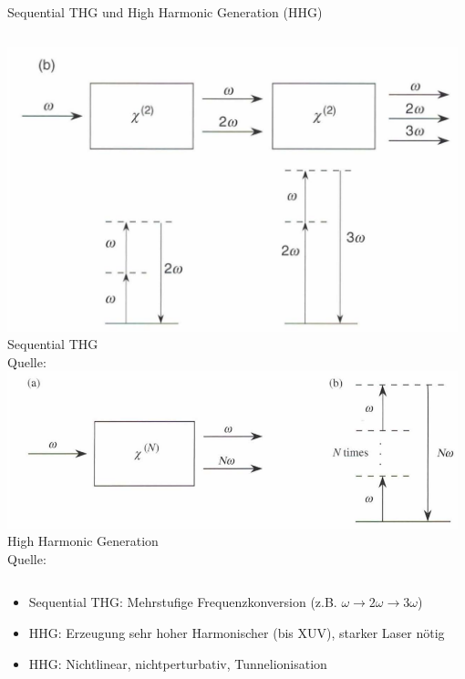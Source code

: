 \documentclass[aspectratio=169]{beamer} %
\newcommand{\figcite}[1]{\\[-3mm]{\tiny Quelle: \cite{#1}}}
\begin{document}

\begin{frame}[noframenumbering]{Sequential THG und High Harmonic Generation (HHG)}
  \begin{columns}[T,onlytextwidth]
      \includegraphics[width=0.98\textwidth]{Images/seq_thg.png}\\[-1mm]{\tiny Sequential THG \figcite{Boyd2020}}
      \includegraphics[width=0.98\textwidth]{Images/hhg.png}\\[-1mm]{\tiny High Harmonic Generation \figcite{Boyd2020}}
  \end{columns}
  \vspace{0.2cm}
  \begin{itemize}
    \item Sequential THG: Mehrstufige Frequenzkonversion (z.B. $\omega \rightarrow 2\omega \rightarrow 3\omega$)
    \item HHG: Erzeugung sehr hoher Harmonischer (bis XUV), starker Laser nötig
    \item HHG: Nichtlinear, nichtperturbativ, Tunnelionisation
  \end{itemize}
\end{frame}
\end{document}
